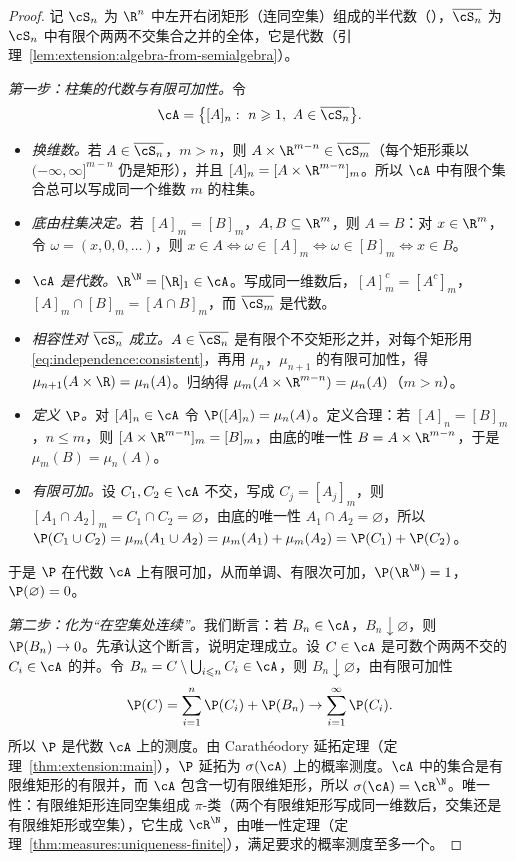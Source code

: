 \begin{proof}
记 $\cS_n$ 为 $\R^n$ 中左开右闭矩形（连同空集）组成的半代数（），$\overline{\cS_n}$ 为 $\cS_n$ 中有限个两两不交集合之并的全体，它是代数（引理~\ref{lem:extension:algebra-from-semialgebra}）。

\emph{第一步：柱集的代数与有限可加性。}令
\[
\cA=\bigl\{[A]_n:\ n\geqslant1,\ A\in\overline{\cS_n}\bigr\}.
\]
\begin{itemize}
\item \emph{换维数。}若 $A\in\overline{\cS_n}$，$m>n$，则 $A\times\R^{m-n}\in\overline{\cS_m}$（每个矩形乘以 $(-\infty,\infty]^{m-n}$ 仍是矩形），并且 $[A]_n=[A\times\R^{m-n}]_m$。所以 $\cA$ 中有限个集合总可以写成同一个维数 $m$ 的柱集。
\item \emph{底由柱集决定。}若 $[A]_m=[B]_m$，$A,B\subseteq\R^m$，则 $A=B$：对 $x\in\R^m$，令 $\omega=(x,0,0,\dots)$，则 $x\in A\iff\omega\in[A]_m\iff\omega\in[B]_m\iff x\in B$。
\item \emph{$\cA$ 是代数。}$\R^\N=[\R]_1\in\cA$。写成同一维数后，$[A]_m^c=[A^c]_m$，$[A]_m\cap[B]_m=[A\cap B]_m$，而 $\overline{\cS_m}$ 是代数。
\item \emph{相容性对 $\overline{\cS_n}$ 成立。}$A\in\overline{\cS_n}$ 是有限个不交矩形之并，对每个矩形用 \eqref{eq:independence:consistent}，再用 $\mu_n$，$\mu_{n+1}$ 的有限可加性，得 $\mu_{n+1}(A\times\R)=\mu_n(A)$。归纳得 $\mu_m(A\times\R^{m-n})=\mu_n(A)$（$m>n$）。
\item \emph{定义 $\P$。}对 $[A]_n\in\cA$ 令 $\P([A]_n)=\mu_n(A)$。定义合理：若 $[A]_n=[B]_m$，$n\leqslant m$，则 $[A\times\R^{m-n}]_m=[B]_m$，由底的唯一性 $B=A\times\R^{m-n}$，于是 $\mu_m(B)=\mu_n(A)$。
\item \emph{有限可加。}设 $C_1,C_2\in\cA$ 不交，写成 $C_j=[A_j]_m$，则 $[A_1\cap A_2]_m=C_1\cap C_2=\varnothing$，由底的唯一性 $A_1\cap A_2=\varnothing$，所以 $\P(C_1\cup C_2)=\mu_m(A_1\cup A_2)=\mu_m(A_1)+\mu_m(A_2)=\P(C_1)+\P(C_2)$。
\end{itemize}
于是 $\P$ 在代数 $\cA$ 上有限可加，从而单调、有限次可加，$\P(\R^\N)=1$，$\P(\varnothing)=0$。

\emph{第二步：化为“在空集处连续”。}我们断言：若 $B_n\in\cA$，$B_n\downarrow\varnothing$，则 $\P(B_n)\to0$。先承认这个断言，说明定理成立。设 $C\in\cA$ 是可数个两两不交的 $C_i\in\cA$ 的并。令 $B_n=C\setminus\bigcup_{i\leqslant n}C_i\in\cA$，则 $B_n\downarrow\varnothing$，由有限可加性
\[
\P(C)=\sum_{i=1}^n\P(C_i)+\P(B_n)\to\sum_{i=1}^\infty \P(C_i).
\]
所以 $\P$ 是代数 $\cA$ 上的测度。由 Carathéodory 延拓定理（定理~\ref{thm:extension:main}），$\P$ 延拓为 $\sigma(\cA)$ 上的概率测度。$\cA$ 中的集合是有限维矩形的有限并，而 $\cA$ 包含一切有限维矩形，所以 $\sigma(\cA)=\cR^\N$。唯一性：有限维矩形连同空集组成 $\pi$-类（两个有限维矩形写成同一维数后，交集还是有限维矩形或空集），它生成 $\cR^\N$，由唯一性定理（定理~\ref{thm:measures:uniqueness-finite}），满足要求的概率测度至多一个。


\end{proof}
